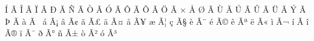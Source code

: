 \mubyte ^^cd ^^c3^^8d\endmubyte %
\mubyte ^^ce ^^c3^^8e\endmubyte %
\mubyte ^^cf ^^c3^^8f\endmubyte %
\mubyte ^^d0 ^^c3^^90\endmubyte %
\mubyte ^^d1 ^^c3^^91\endmubyte %
\mubyte ^^d2 ^^c3^^92\endmubyte %
\mubyte ^^d3 ^^c3^^93\endmubyte %
\mubyte ^^d4 ^^c3^^94\endmubyte %
\mubyte ^^d5 ^^c3^^95\endmubyte %
\mubyte ^^d6 ^^c3^^96\endmubyte %
\mubyte ^^d7 ^^c5^^92\endmubyte %
\mubyte ^^d8 ^^c3^^98\endmubyte %
\mubyte ^^d9 ^^c3^^99\endmubyte %
\mubyte ^^da ^^c3^^9a\endmubyte %
\mubyte ^^db ^^c3^^9b\endmubyte %
\mubyte ^^dc ^^c3^^9c\endmubyte %
\mubyte ^^dd ^^c3^^9d\endmubyte %
\mubyte ^^de ^^c3^^9e\endmubyte %
\mubyte ^^e0 ^^c3^^a0\endmubyte %
\mubyte ^^e1 ^^c3^^a1\endmubyte %
\mubyte ^^e2 ^^c3^^a2\endmubyte %
\mubyte ^^e3 ^^c3^^a3\endmubyte %
\mubyte ^^e4 ^^c3^^a4\endmubyte %
\mubyte ^^e5 ^^c3^^a5\endmubyte %
\mubyte ^^e6 ^^c3^^a6\endmubyte %
\mubyte ^^e7 ^^c3^^a7\endmubyte %
\mubyte ^^e8 ^^c3^^a8\endmubyte %
\mubyte ^^e9 ^^c3^^a9\endmubyte %
\mubyte ^^ea ^^c3^^aa\endmubyte %
\mubyte ^^eb ^^c3^^ab\endmubyte %
\mubyte ^^ec ^^c3^^ac\endmubyte %
\mubyte ^^ed ^^c3^^ad\endmubyte %
\mubyte ^^ee ^^c3^^ae\endmubyte %
\mubyte ^^ef ^^c3^^af\endmubyte %
\mubyte ^^f0 ^^c3^^b0\endmubyte %
\mubyte ^^f1 ^^c3^^b1\endmubyte %
\mubyte ^^f2 ^^c3^^b2\endmubyte %
\mubyte ^^f3 ^^c3^^b3\endmubyte %
